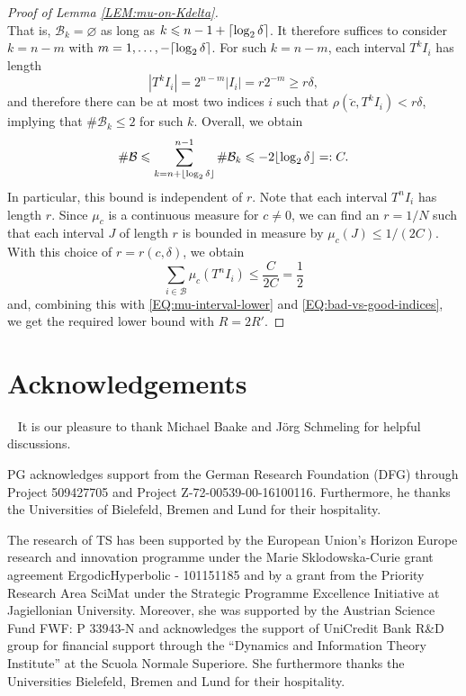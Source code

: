 \documentclass[11pt,reqno]{amsart}
\theoremstyle{plain}
\theoremstyle{definition}
\newcommand{\mc}{\mathcal}
\renewcommand{\emptyset}{\varnothing}
\DeclarePairedDelimiter{\ceil}{\lceil}{\rceil}
\DeclarePairedDelimiter{\floor}{\lfloor}{\rfloor}
\begin{document}
\begin{proof}[Proof of Lemma \ref{LEM:mu-on-Kdelta}]
\[\]
That is, $\mc B_k = \emptyset$ as long as $k \leqslant n-1 + \ceil{\log_2 \delta}$. 
It therefore suffices to consider $k = n-m$ with $m = 1, \ldots, -\ceil{\log_2 \delta}$. For such $k = n-m$, each interval $T^k I_i$ has length
\[
|T^k I_i| = 2^{n-m}  |I_i| = r 2^{-m} \geqslant r \delta,
\]
and therefore there can be at most two indices $i$ such that $\rho(\breve{c},T^k I_i) < r \delta$, implying that $\# \mc B_k \leqslant 2$ for such $k$. Overall, we obtain
\[
\# \mc B \leqslant \sum_{k=n+ \floor{\log_2 \delta}}^{n-1} \# \mc B_k 
\leqslant -2 \floor{\log_2 \delta} =: C.
\]
In particular, this bound is independent of $r$. Note that each interval $T^n I_i$ has length $r$. Since $\mu_c$ is a continuous measure for $c \neq 0$, we can find an $r = 1/N$ such that each interval $J$ of length $r$ is bounded in measure by $\mu_c(J) \leqslant 1/(2C)$. With this choice of $r = r(c,\delta)$, we obtain 
\[
\sum_{i \in \mc B} \mu_c(T^n I_i) \leqslant \frac{C}{2C} = \frac{1}{2}
\]
and, combining this with \eqref{EQ:mu-interval-lower} and \eqref{EQ:bad-vs-good-indices}, we get the required lower bound with $R = 2 R'$.
\end{proof}








\section*{Acknowledgements} 
~
It is our pleasure to thank Michael Baake and J\"org Schmeling for helpful discussions.

PG acknowledges
support from the German Research Foundation (DFG) through Project 509427705 and Project Z-72-00539-00-16100116. Furthermore, he thanks the Universities of Bielefeld, Bremen and Lund for their hospitality. 

The research of TS has been supported by the
European Union’s Horizon Europe
research and innovation programme under the Marie Sklodowska-Curie grant agreement ErgodicHyperbolic - 101151185 and by a grant from the Priority Research Area SciMat under the Strategic Programme Excellence Initiative at Jagiellonian University. 
Moreover, she was supported by the Austrian Science Fund FWF: P 33943-N
and acknowledges the support of UniCredit Bank R\&D group for financial support through the ``Dynamics and Information Theory Institute'' at
the Scuola Normale Superiore.
She furthermore thanks the Universities Bielefeld, Bremen and Lund for their hospitality. 
\end{document}
